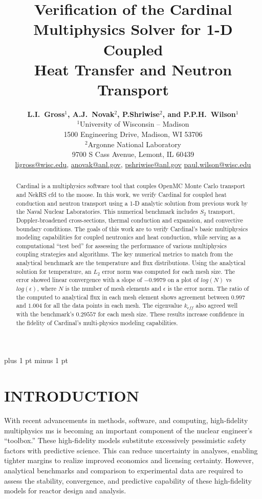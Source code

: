 \documentclass[letterpaper]{mc2023}
\title{Verification of the Cardinal Multiphysics Solver for 1-D Coupled\\
Heat Transfer and Neutron Transport}
\author{%
  \textbf{L.I.~Gross$^1$, A.J.~Novak$^2$, P.Shriwise$^2$, and P.P.H.~Wilson$^1$}\\
  $^1$University of Wisconsin -- Madison  \\
  1500 Engineering Drive, Madison, WI 53706 \vspace{6pt}\\
  $^2$Argonne National Laboratory \\
  9700 S Cass Avenue, Lemont, IL 60439\vspace{6pt} \\
  \url{ligross@wisc.edu}, \url{anovak@anl.gov}, \url{pshriwise@anl.gov} \url{paul.wilson@wisc.edu}
}
\begin{document}
\maketitle
\justify
\parskip 6pt plus 1 pt minus 1 pt

\begin{abstract}
  Cardinal is a multiphysics software tool that couples OpenMC Monte Carlo transport and NekRS \gls{cfd} to the \gls{moose}.
  In this work, we verify Cardinal for coupled heat conduction and neutron transport using a 1-D analytic solution from previous
  work by the Naval Nuclear Laboratories. This numerical benchmark includes $S_2$ transport, Doppler-broadened cross-sections,
  thermal conduction and expansion, and convective boundary conditions. The goals of this work are to verify Cardinal's basic
  multiphysics modeling capabilities for coupled neutronics and heat conduction, while serving as a computational ``test bed''
  for assessing the performance of various multiphysics coupling strategies and algorithms. The key numerical metrics to match
  from the analytical benchmark are the temperature and flux distributions. Using the analytical solution for temperature, an
  $L_{2}$ error norm was computed for each mesh size. The error showed linear convergence with a slope of $-0.9979$ on a plot
  of $log(N)$ vs $log(\epsilon)$, where $N$ is the number of mesh elements and $\epsilon$ is the error norm. The ratio of the
  computed to analytical flux in each mesh element shows agreement between $0.997$ and $1.004$ for all the data points in
  each mesh. The eigenvalue $k_{eff}$ also agreed well with the benchmark's $0.29557$ for each mesh size. These results increase
  confidence in the fidelity of Cardinal's multi-physics modeling capabilities.
\end{abstract}
\vspace{6pt}

\section{INTRODUCTION}
\label{sec:intro}
With recent advancements in methods, software, and computing, high-fidelity multiphysics \gls{ms} is becoming an important
component of the nuclear engineer's ``toolbox.'' These high-fidelity models substitute excessively pessimistic safety factors
with predictive science. This can reduce uncertainty in analyses, enabling tighter margins to realize improved economics
and licensing certainty. However, analytical benchmarks and comparison to experimental data are required to assess the stability,
convergence, and predictive capability of these high-fidelity models for reactor design and analysis.
\end{document}
